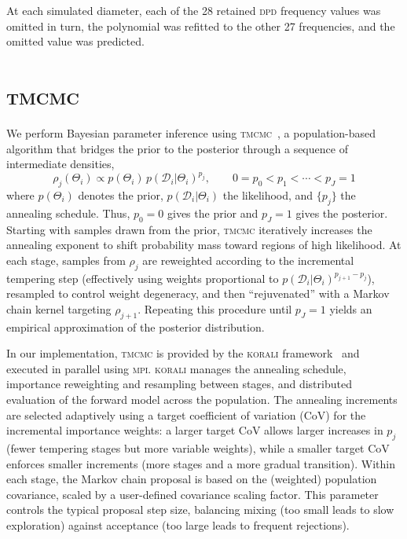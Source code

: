 \documentclass[%
 aip,
 jcp,
 amsmath,amssymb,
 preprint,%
]{revtex4-1}
\begin{document}
At each simulated diameter, each of the 28 retained \textsc{dpd} frequency values was omitted in turn, the polynomial was refitted to the other 27 frequencies, and the omitted value was predicted.

\section{\textsc{tmcmc}}
\label{app:tmcmc}
We perform Bayesian parameter inference using \textsc{tmcmc}~\citep{ching2007transitional}, a population-based algorithm that bridges the prior to the posterior through a sequence of intermediate densities,
\begin{equation}
\rho_j(\Theta_i) \propto p(\Theta_i)\, p(\mathcal{D}_i|\Theta_i)^{p_j}, \qquad 0 = p_0 < p_1 < \cdots < p_J = 1
\end{equation}
where $p(\Theta_i)$ denotes the prior, $p(\mathcal{D}_i|\Theta_i)$ the likelihood, and $\{p_j\}$ the annealing schedule. Thus, $p_0=0$ gives the prior and $p_J=1$ gives the posterior. Starting with samples drawn from the prior, \textsc{tmcmc} iteratively increases the annealing exponent to shift probability mass toward regions of high likelihood. At each stage, samples from $\rho_j$ are reweighted according to the incremental tempering step (effectively using weights proportional to $p(\mathcal{D}_i|\Theta_i)^{p_{j+1}-p_j}$), resampled to control weight degeneracy, and then ``rejuvenated'' with a Markov chain kernel targeting $\rho_{j+1}$. Repeating this procedure until $p_J=1$ yields an empirical approximation of the posterior distribution.

In our implementation, \textsc{tmcmc} is provided by the \textsc{korali} framework~\citep{martin2022korali} and executed in parallel using \textsc{mpi}. \textsc{korali} manages the annealing schedule, importance reweighting and resampling between stages, and distributed evaluation of the forward model across the population. The annealing increments are selected adaptively using a target coefficient of variation (CoV) for the incremental importance weights: a larger target CoV allows larger increases in $p_j$ (fewer tempering stages but more variable weights), while a smaller target CoV enforces smaller increments (more stages and a more gradual transition). Within each stage, the Markov chain proposal is based on the (weighted) population covariance, scaled by a user-defined covariance scaling factor. This parameter controls the typical proposal step size, balancing mixing (too small leads to slow exploration) against acceptance (too large leads to frequent rejections).
\end{document}
